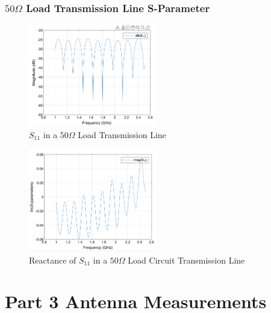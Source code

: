 \documentclass{article} %
\begin{document}
\subsubsection*{$50 \Omega$ Load Transmission Line S-Parameter}
\begin{figure}[H]
    \centering
    \includegraphics[width=0.5\textwidth]{./image/figure8.png}
    \caption{$S_{11}$ in a $50 \Omega$ Load Transmission Line}
\end{figure}
\begin{figure}[H]
    \centering
    \includegraphics[width=0.5\textwidth]{./image/figure9.png}
    \caption{Reactance of $S_{11}$ in a $50 \Omega$ Load Circuit Transmission Line}
\end{figure}

\section*{Part 3 Antenna Measurements}
\end{document}

